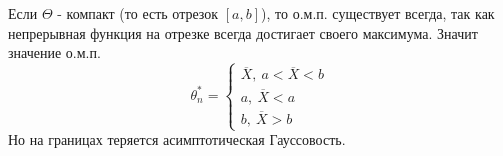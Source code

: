 \begin{example}
    Если \(\Theta\) - компакт (то есть отрезок \([a, b]\)), то о.м.п. существует
    всегда, так как непрерывная функция на отрезке всегда достигает своего максимума.
    Значит значение о.м.п.
    \begin{equation*}
        \theta^*_n = \begin{cases}
            \overline{X},\ a < \overline{X} < b \\
            a,\ \overline{X} < a \\
            b,\ \overline{X} > b
        \end{cases}
    \end{equation*}
    Но на границах теряется асимптотическая Гауссовость.
\end{example}

